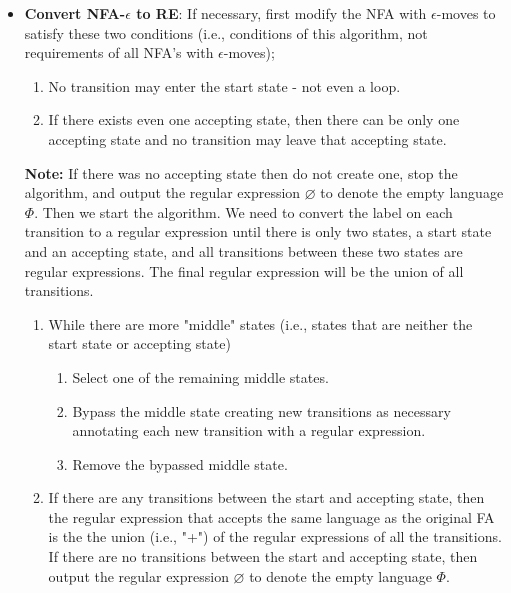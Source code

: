 \documentclass{report}
\begin{document}
\begin{itemize}
    \item \textbf{Convert NFA-$\epsilon$ to RE}:
        If necessary, first modify the NFA with $\epsilon$-moves to satisfy these two conditions (i.e., conditions of this algorithm, not requirements of all NFA's with $\epsilon$-moves);
        \begin{enumerate}[label=\alph*)]
            \item No transition may enter the start state - not even a loop. 
            \item  If there exists even one accepting state, then there can be only one accepting state and no transition may leave that accepting state.
        \end{enumerate}
        \bigbreak \noindent 
        \textbf{Note:} If there was no accepting state then do not create one, stop the algorithm, and output the regular expression $\varnothing$ to denote the empty language $\Phi$.
        \bigbreak \noindent 
        Then we start the algorithm. We need to convert the label on each transition to a regular expression until there is only two states, a start state and an accepting state, and all transitions between these two states are regular expressions. The final regular expression will be the union of all transitions.
        \begin{enumerate}
            \item  While there are more "middle" states (i.e., states that are neither the start state or accepting state)
                \begin{enumerate}[label=(\roman*)]
                    \item Select one of the remaining middle states.
                    \item Bypass the middle state creating new transitions as necessary annotating each new transition with a regular expression.
                    \item Remove the bypassed middle state.
                \end{enumerate}
            \item If there are any transitions between the start and accepting state, then the regular expression that accepts the same language as the original FA is the the union (i.e., "+") of the regular expressions of all the transitions. 
                \bigbreak \noindent 
                If there are no transitions between the start and accepting state, then output the regular expression $\varnothing$ to denote the empty language $\Phi$.
        \end{enumerate}

\end{itemize}
\end{document}

